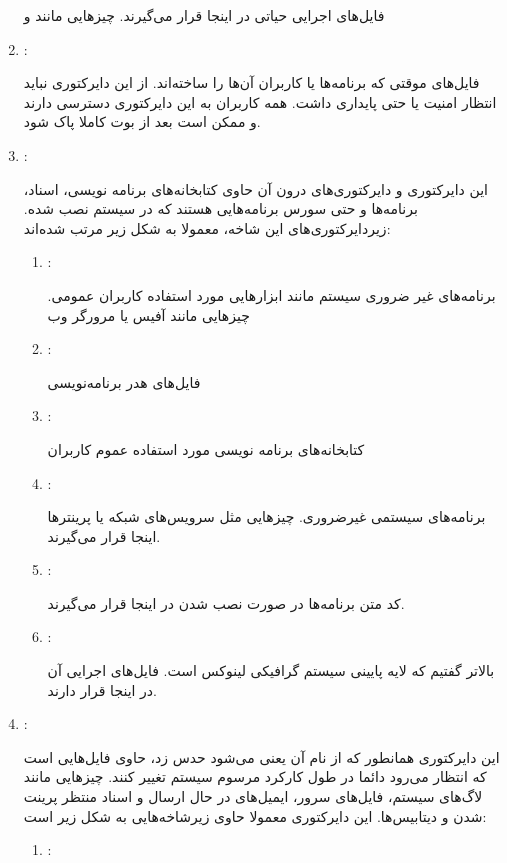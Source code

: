 \begin{enumerate}
فایل‌های اجرایی حیاتی در اینجا قرار می‌گیرند. چیزهایی مانند 
 و 

\item {\large{}}:

فایل‌های موقتی که برنامه‌ها یا کاربران آن‌ها را ساخته‌اند. از این دایرکتوری نباید انتظار امنیت یا حتی پایداری داشت. همه کاربران به این دایرکتوری دسترسی دارند و ممکن است بعد از بوت کاملا پاک شود.
\item {\large{}}:

این دایرکتوری و دایرکتوری‌های درون آن حاوی کتابخانه‌های برنامه نویسی، اسناد، برنامه‌ها و حتی سورس برنامه‌هایی هستند که در سیستم نصب شده. زیردایرکتوری‌های این شاخه، معمولا به شکل زیر مرتب شده‌اند:
\begin{enumerate}
\item {\large{}}:

برنامه‌های غیر ضروری سیستم مانند ابزارهایی مورد استفاده کاربران عمومی. چیزهایی مانند آفیس یا مرورگر وب
\item {\large{}}:

فایل‌های هدر برنامه‌نویسی
\item {\large{}}:

کتابخانه‌های برنامه نویسی مورد استفاده عموم کاربران
\item {\large{}}:

برنامه‌های سیستمی غیرضروری. چیزهایی مثل سرویس‌های شبکه یا پرینترها اینجا قرار می‌گیرند.
\item {\large{}}:

کد متن برنامه‌ها در صورت نصب شدن در اینجا قرار می‌گیرند.
\item {\large{}}:

بالاتر گفتیم که 
 لایه پایینی سیستم گرافیکی لینوکس است. فایل‌های اجرایی آن در اینجا قرار دارند.
\end{enumerate}
\item {\large{}}:

این دایرکتوری همانطور که از نام آن یعنی 
 می‌شود حدس زد، حاوی فایل‌هایی است که انتظار می‌رود دائما در طول کارکرد مرسوم سیستم تغییر کنند. چیزهایی مانند لاگ‌های سیستم، فایل‌های سرور، ایمیل‌های در حال ارسال و اسناد منتظر پرینت شدن و دیتابیس‌ها. این دایرکتوری معمولا حاوی زیرشاخه‌هایی به شکل زیر است:
\begin{enumerate}
\item {\large{}}:


\end{enumerate}
\end{enumerate}
